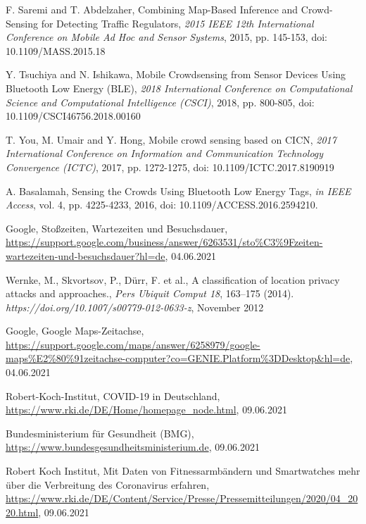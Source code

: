 \documentclass[conference,compsoc]{IEEEtran}
\begin{document}
\begin{thebibliography}{00}
 F. Saremi and T. Abdelzaher, \glqq Combining Map-Based Inference and Crowd-Sensing for Detecting Traffic Regulators\grqq, \textit{2015 IEEE 12th International Conference on Mobile Ad Hoc and Sensor Systems}, 2015, pp. 145-153, doi: 10.1109/MASS.2015.18

 Y. Tsuchiya and N. Ishikawa, \glqq Mobile Crowdsensing from Sensor Devices Using Bluetooth Low Energy (BLE)\grqq,\textit{ 2018 International Conference on Computational Science and Computational Intelligence (CSCI)}, 2018, pp. 800-805, doi: 10.1109/CSCI46756.2018.00160

 T. You, M. Umair and Y. Hong, \glqq Mobile crowd sensing based on CICN\grqq, \textit{2017 International Conference on Information and Communication Technology Convergence (ICTC)}, 2017, pp. 1272-1275, doi: 10.1109/ICTC.2017.8190919

 A. Basalamah, \glqq Sensing the Crowds Using Bluetooth Low Energy Tags\grqq, \textit{in IEEE Access}, vol. 4, pp. 4225-4233, 2016, doi: 10.1109/ACCESS.2016.2594210.

 Google, \glqq Stoßzeiten, Wartezeiten und Besuchsdauer\grqq, \url{https://support.google.com/business/answer/6263531/sto%C3%9Fzeiten-wartezeiten-und-besuchsdauer?hl=de}, 04.06.2021

 Wernke, M., Skvortsov, P., Dürr, F. et al., \glqq A classification of location privacy attacks and approaches.\grqq, \textit{Pers Ubiquit Comput 18}, 163–175 (2014).\textit{ https://doi.org/10.1007/s00779-012-0633-z}, November 2012

 Google, \glqq Google Maps-Zeitachse\grqq, \\ \url{https://support.google.com/maps/answer/6258979/google-maps%E2%80%91zeitachse-computer?co=GENIE.Platform%3DDesktop&hl=de}, 04.06.2021

 Robert-Koch-Institut, \glqq COVID-19 in Deutschland\grqq,\\ \url{https://www.rki.de/DE/Home/homepage_node.html}, 09.06.2021

 Bundesministerium für Gesundheit (BMG),\\ \url{https://www.bundesgesundheitsministerium.de}, 09.06.2021

 Robert Koch Institut, \glqq Mit Daten von Fitnessarmbändern und Smartwatches mehr über die Verbreitung des Coronavirus erfahren\grqq,\\ \url{https://www.rki.de/DE/Content/Service/Presse/Pressemitteilungen/2020/04_2020.html}, 09.06.2021


\end{thebibliography}
\end{document}
